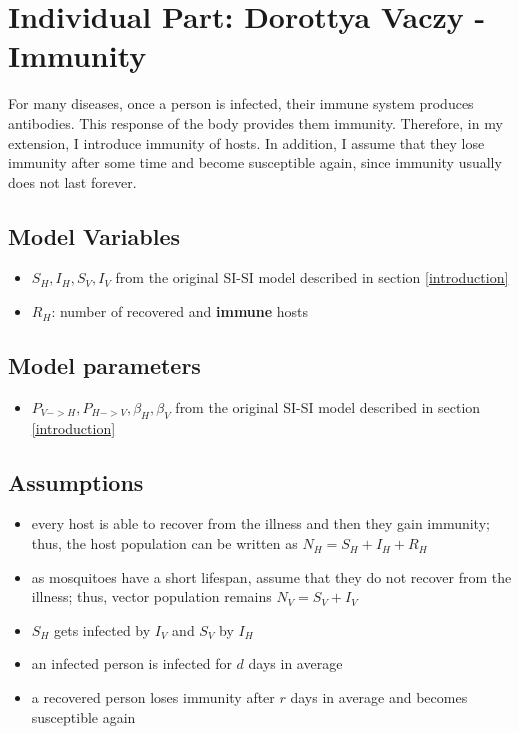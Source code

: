 \section{Individual Part: Dorottya Vaczy - Immunity} \label{group}

For many diseases, once a person is infected, their immune system produces antibodies. This response of the body provides them immunity. Therefore, in my extension, I introduce immunity of hosts. In addition, I assume that they lose immunity after some time and become susceptible again, since immunity usually does not last forever.

\subsection*{Model Variables}

\begin{itemize}
    \item $S_H, I_H, S_V, I_V$ from the original SI-SI model described in section \ref{introduction}
    \item $R_H$: number of recovered and \textbf{immune} hosts
\end{itemize}

\subsection*{Model parameters}

\begin{itemize}
    \item $P_{V->H}, P_{H->V}, \beta_H, \beta_V$ from the original SI-SI model described in section \ref{introduction}
\end{itemize}

\subsection*{Assumptions}

\begin{itemize}
    \item every host is able to recover from the illness and then they gain immunity; thus, the host population can be written as $N_H = S_H + I_H + R_H$
    \item as mosquitoes have a short lifespan, assume that they do not recover from the illness; thus, vector population remains $N_V = S_V + I_V$
    \item $S_H$ gets infected by $I_V$ and $S_V$ by $I_H$
    \item an infected person is infected for $d$ days in average
    \item a recovered person loses immunity after $r$ days in average and becomes susceptible again
\end{itemize}

